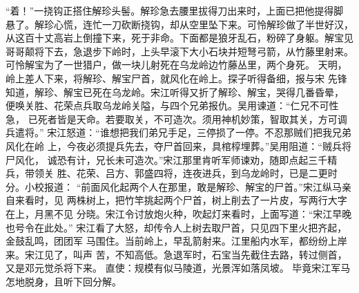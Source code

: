 “着！”一挠钩正搭住解珍头髻。解珍急去腰里拔得刀出来时，上面已把他提得脚
悬了。解珍心慌，连忙一刀砍断挠钩，却从空里坠下来。可怜解珍做了半世好汉，
从这百十丈高岩上倒撞下来，死于非命。下面都是狼牙乱石，粉碎了身躯。解宝见
哥哥颠将下去，急退步下岭时，上头早滚下大小石块并短弩弓箭，从竹藤里射来。
可怜解宝为了一世猎户，做一块儿射死在乌龙岭边竹藤丛里，两个身死。
天明，岭上差人下来，将解珍、解宝尸首，就风化在岭上。探子听得备细，报与宋
先锋知道，解珍、解宝已死在乌龙岭。宋江听得又折了解珍、解宝，哭得几番昏晕，
便唤关胜、花荣点兵取乌龙岭关隘，与四个兄弟报仇。吴用谏道：“仁兄不可性急，
已死者皆是天命。若要取关，不可造次。须用神机妙策，智取其关，方可调兵遣将。”
宋江怒道：“谁想把我们弟兄手足，三停损了一停。不忍那贼们把我兄弟风化在岭
上，今夜必须提兵先去，夺尸首回来，具棺椁埋葬。”吴用阻道：“贼兵将尸风化，
诚恐有计，兄长未可造次。”宋江那里肯听军师谏劝，随即点起三千精兵，带领关
胜、花荣、吕方、郭盛四将，连夜进兵，到乌龙岭时，已是二更时分。小校报道：
“前面风化起两个人在那里，敢是解珍、解宝的尸首。”宋江纵马亲自来看时，见
两株树上，把竹竿挑起两个尸首，树上削去了一片皮，写两行大字在上，月黑不见
分晓。宋江令讨放炮火种，吹起灯来看时，上面写道：“宋江早晚也号令在此处。”
宋江看了大怒，却传令人上树去取尸首，只见四下里火把齐起，金鼓乱鸣，团团军
马围住。当前岭上，早乱箭射来。江里船内水军，都纷纷上岸来。宋江见了，叫声
苦，不知高低。急退军时，石宝当先截住去路，转过侧首，又是邓元觉杀将下来。
直使：规模有似马陵道，光景浑如落凤坡。
毕竟宋江军马怎地脱身，且听下回分解。